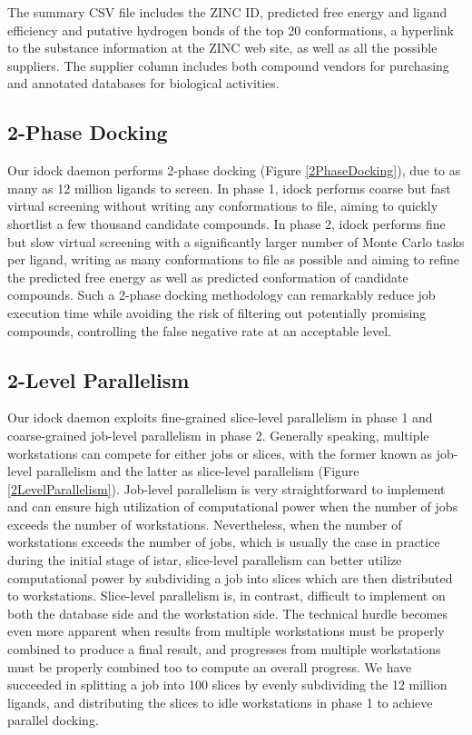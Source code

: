 \documentclass[12pt]{article}
\begin{document}
The summary CSV file includes the ZINC ID, predicted free energy and ligand efficiency and putative hydrogen bonds of the top 20 conformations, a hyperlink to the substance information at the ZINC web site, as well as all the possible suppliers. The supplier column includes both compound vendors for purchasing and annotated databases for biological activities.

\subsection*{\sffamily \large 2-Phase Docking}

Our idock daemon performs 2-phase docking (Figure \ref{2PhaseDocking}), due to as many as 12 million ligands to screen. In phase 1, idock performs coarse but fast virtual screening without writing any conformations to file, aiming to quickly shortlist a few thousand candidate compounds. In phase 2, idock performs fine but slow virtual screening with a significantly larger number of Monte Carlo tasks per ligand, writing as many conformations to file as possible and aiming to refine the predicted free energy as well as predicted conformation of candidate compounds. Such a 2-phase docking methodology can remarkably reduce job execution time while avoiding the risk of filtering out potentially promising compounds, controlling the false negative rate at an acceptable level.

\subsection*{\sffamily \large 2-Level Parallelism}

Our idock daemon exploits fine-grained slice-level parallelism in phase 1 and coarse-grained job-level parallelism in phase 2. Generally speaking, multiple workstations can compete for either jobs or slices, with the former known as job-level parallelism and the latter as slice-level parallelism (Figure \ref{2LevelParallelism}). Job-level parallelism is very straightforward to implement and can ensure high utilization of computational power when the number of jobs exceeds the number of workstations. Nevertheless, when the number of workstations exceeds the number of jobs, which is usually the case in practice during the initial stage of istar, slice-level parallelism can better utilize computational power by subdividing a job into slices which are then distributed to workstations. Slice-level parallelism is, in contrast, difficult to implement on both the database side and the workstation side. The technical hurdle becomes even more apparent when results from multiple workstations must be properly combined to produce a final result, and progresses from multiple workstations must be properly combined too to compute an overall progress. We have succeeded in splitting a job into 100 slices by evenly subdividing the 12 million ligands, and distributing the slices to idle workstations in phase 1 to achieve parallel docking.
\end{document}
